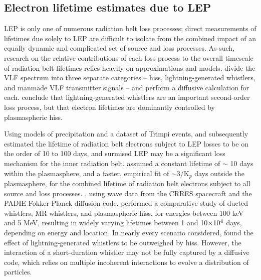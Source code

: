 \subsection{Electron lifetime estimates due to LEP}
LEP is only one of numerous radiation belt loss processes; direct measurements of lifetimes due solely to LEP are difficult to isolate from the combined impact of an equally dynamic and complicated set of source and loss processes. As such, research on the relative contributions of each loss process to the overall timescale of radiation belt lifetimes relies heavily on approximations and models. \cite{Abel1998} divide the VLF spectrum into three separate categories -- hiss, lightning-generated whistlers, and manmade VLF transmitter signals -- and perform a diffusive calculation for each. \citeauthor{Abel1998} conclude that lightning-generated whistlers are an important second-order loss process, but that electron lifetimes are dominantly controlled by plasmaspheric hiss.

Using models of precipitation and a dataset of Trimpi events, \cite{Rodger2003} and subsequently \cite{Rodger2010} estimated the lifetime of radiation belt electrons subject to LEP losses to be on the order of 10 to 100 days, and surmised LEP may be a significant loss mechanism for the inner radiation belt. \cite{Shprits2005} assumed a constant lifetime of $\sim$ 10 days within the plasmasphere, and a faster, empirical fit of $\sim 3$/K$_p$ days outside the plasmasphere, for the combined lifetime of radiation belt electrons subject to all source and loss processes. \cite{Meredith2007}, using wave data from the CRRES spacecraft and the PADIE Fokker-Planck diffusion code, performed a comparative study of ducted whistlers, MR whistlers, and plasmaspheric hiss, for energies between 100 keV and 5 MeV, resulting in widely varying lifetimes between 1 and 10$\times 10^{4}$ days, depending on energy and location. In nearly every scenario considered, \citeauthor{Meredith2007} found the effect of lightning-generated whistlers to be outweighed by hiss. However, the interaction of a short-duration whistler may not be fully captured by a diffusive code, which relies on multiple incoherent interactions to evolve a distribution of particles.



